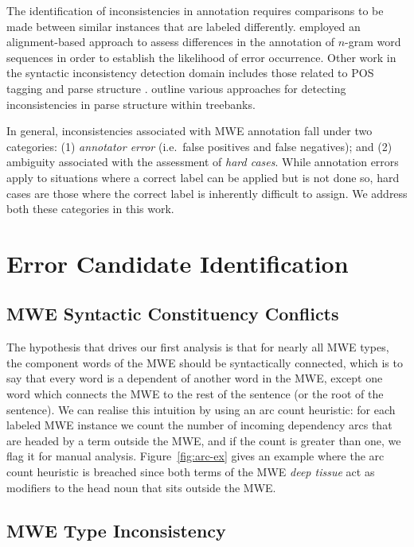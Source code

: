 \documentclass[output=paper
,modfonts
,nonflat]{langsci/langscibook}
\newcommand{\lex}[1]{\textit{#1}\xspace}
\newcommand{\ngram}[1][]{$n$-gram{#1}\xspace}
\newcommand{\figureref}[1]{Figure~\ref{#1}\xspace}
\begin{document}
The identification of inconsistencies in annotation requires comparisons to be made between similar instances that are labeled differently. \citet{boyd-et-al:07a} employed an alignment-based approach to assess differences in the annotation of \ngram word sequences in order to establish the likelihood of error occurrence.  Other work in the syntactic inconsistency detection domain includes those related to POS tagging \citep{loftsson2009correcting,Eskin:2000:DEW:974305.974325,ma2001line} and parse structure \citep{ule2004unexpected,kato2010correcting}. \citet{Dickinson03} outline various approaches for detecting inconsistencies in parse structure within treebanks. 

In general, inconsistencies associated with MWE annotation fall under two categories: (1) \lex{annotator error} (i.e.\ false positives and false negatives); and (2) ambiguity associated with the assessment of \lex{hard cases}. While annotation errors apply to situations where a correct label can be applied but is not done so, hard cases are those where the correct label is inherently difficult to assign. We address both these categories in this work.  

\section{Error Candidate Identification}

\subsection{MWE Syntactic Constituency Conflicts}

The hypothesis that drives our first analysis is that for nearly all MWE types, the component words of the MWE should be syntactically connected, which is to say that every word is a dependent of another word in the MWE, except one word which connects the MWE to the rest of the sentence (or the root of the sentence). We can realise this intuition by using an arc count heuristic: for each labeled MWE instance we count the number of incoming dependency arcs that are headed by a term outside the MWE, and if the count is greater than one, we flag it for manual analysis. \figureref{fig:arc-ex} gives an example where the arc count heuristic is breached since both terms of the MWE \lex{deep tissue} act as modifiers to the head noun that sits outside the MWE.

\subsection{MWE Type Inconsistency}
\end{document}
